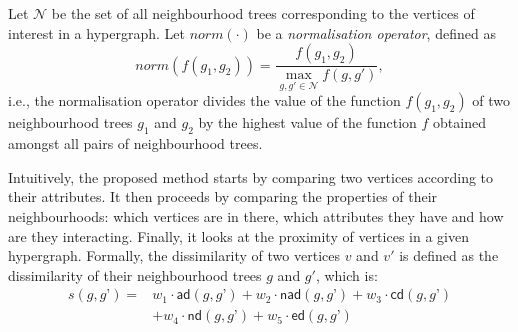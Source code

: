 Let $\mathcal{N}$ be the set of all neighbourhood trees corresponding to the vertices of interest in a hypergraph.
Let $norm(\cdot)$ be a \textit{normalisation operator}, defined as $$norm(f(g_1,g_2)) = \frac{f(g_1,g_2)}{\underset{g,g' \in \mathcal{N}}{\max} f(g,g')},$$ i.e., the normalisation operator divides the value of the function $f(g_1,g_2)$ of two neighbourhood trees $g_1$ and $g_2$ by the highest value of the function $f$ obtained amongst all pairs of neighbourhood trees.



Intuitively, the proposed method starts by comparing two vertices according to their attributes.
It then proceeds by comparing the properties of their neighbourhoods: which vertices are in there, which attributes they have and how are they interacting.
Finally, it looks at the proximity of vertices in a given hypergraph.
Formally, the dissimilarity of two vertices $v$ and $v'$ is defined as the dissimilarity of their neighbourhood trees $g$ and $g'$, which is:
\begin{equation}
\label{eq:Sim}
\begin{split}
s(g,g’) = & w_1 \cdot \mathsf{ad}(g,g’) + w_2 \cdot \mathsf{nad}(g,g’) + w_3 \cdot \mathsf{cd}(g,g’) \\
     & + w_4 \cdot \mathsf{nd}(g,g’) + w_5 \cdot \mathsf{ed}(g,g’)
 \end{split}
\end{equation}

